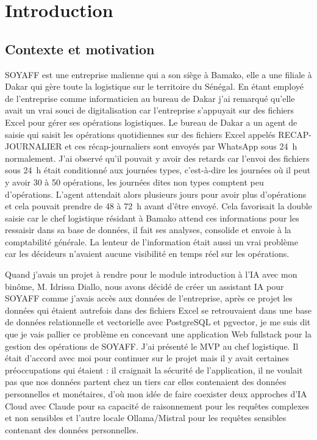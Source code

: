 \chapter*{Introduction}

\section*{Contexte et motivation}
\label{sec:contexte}

SOYAFF est une entreprise malienne qui a son siège à Bamako, elle a une filiale à Dakar qui gère toute la logistique sur le territoire du Sénégal. En étant employé de l'entreprise comme informaticien au bureau de Dakar j'ai remarqué qu'elle avait un vrai souci de digitalisation car l'entreprise s'appuyait sur des fichiers Excel pour gérer ses opérations logistiques. Le bureau de Dakar a un agent de saisie qui saisit les opérations quotidiennes sur des fichiers Excel appelés \og RECAP-JOURNALIER \fg{} et ces récap-journaliers sont envoyés par WhatsApp sous 24~h normalement. J'ai observé qu'il pouvait y avoir des retards car l'envoi des fichiers sous 24~h était conditionné aux journées types, c'est-à-dire les journées où il peut y avoir 30 à 50 opérations, les journées dites non types comptent peu d'opérations. L'agent attendait alors plusieurs jours pour avoir plus d'opérations et cela pouvait prendre de 48 à 72~h avant d'être envoyé. Cela favorisait la double saisie car le chef logistique résidant à Bamako attend ces informations pour les ressaisir dans sa base de données, il fait ses analyses, consolide et envoie à la comptabilité générale. La lenteur de l'information était aussi un vrai problème car les décideurs n'avaient aucune visibilité en temps réel sur les opérations.

Quand j’avais un projet à rendre pour le module introduction à l’IA avec mon binôme, M. Idrissa Diallo, nous avons décidé de créer un assistant IA pour SOYAFF comme j’avais accès aux données de l’entreprise, après ce projet les données qui étaient autrefois dans des fichiers Excel se retrouvaient dans une base de données relationnelle et vectorielle avec PostgreSQL et pgvector, je me suis dit que je vais pallier ce problème en concevant une application Web fullstack pour la gestion des opérations de SOYAFF. J’ai présenté le MVP au chef logistique. Il était d’accord avec moi pour continuer sur le projet mais il y avait certaines préoccupations qui étaient : il craignait la sécurité de l’application, il ne voulait pas que nos données partent chez un tiers car elles contenaient des données personnelles et monétaires, d’où mon idée de faire coexister deux approches d’IA Cloud avec Claude pour sa capacité de raisonnement pour les requêtes complexes et non sensibles et l’autre locale Ollama/Mistral pour les requêtes sensibles contenant des données personnelles.

